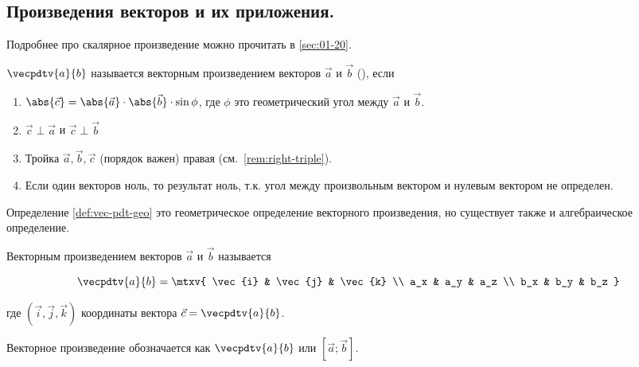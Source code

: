 \subsection{%
  Произведения векторов и их приложения.%
}

Подробнее про скалярное произведение можно прочитать в \ref{sec:01-20}.

\begin{definition} \label{def:vec-pdt-geo}
  \(\vecpdtv{a}{b}\) называется векторным произведением векторов \(\vec{a}\) и
  \(\vec{b}\) (), если 

  \begin{enumerate}
  \item
    \(\abs{\vec{c}} = \abs{\vec{a}} \cdot \abs{\vec{b}} \cdot \sin \phi\), где
    \(\phi\) это геометрический угол между \(\vec{a}\) и \(\vec{b}\).

  \item
    \(\vec{c} \perp \vec{a}\) и \(\vec{c} \perp \vec{b}\)

  \item
    Тройка \(\vec{a}, \vec{b}, \vec{c}\) (порядок важен) правая
    (см.~\ref{rem:right-triple}).

  \item
    Если один векторов ноль, то результат ноль, т.к. угол между произвольным
    вектором и нулевым вектором не определен.
  \end{enumerate}
\end{definition}

Определение \ref{def:vec-pdt-geo} это геометрическое определение векторного
произведения, но существует также и алгебраическое определение.

\begin{definition}
  Векторным произведением векторов \(\vec{a}\) и \(\vec{b}\) называется

  \begin{equation*}
    \vecpdtv{a}{b} = \mtxv{
      \vec{i} & \vec{j} & \vec{k} \\
      a_x     & a_y     & a_z     \\
      b_x     & b_y     & b_z
    } 
  \end{equation*}

  где \((\vec{i}, \vec{j}, \vec{k})\) координаты вектора \(\vec{c} =
  \vecpdtv{a}{b}\).
\end{definition}

Векторное произведение обозначается как \(\vecpdtv{a}{b}\) или \([\vec{a};
\vec{b}]\).

